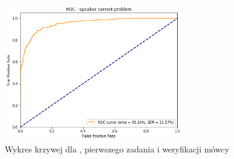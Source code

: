 \begin{figure}[H]
        \centering
        \includegraphics[width=0.7\textwidth]{images/4_3_hmm_roc_speaker}
        \caption{Wykres krzywej  dla , pierwszego zadania  i weryfikacji mówcy}
        \label{fig:4_3_hmm_roc_speaker}
\end{figure}

